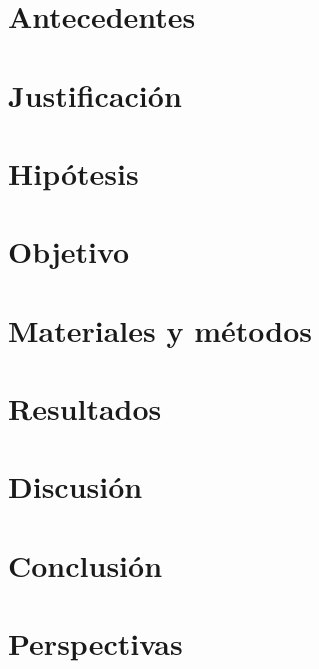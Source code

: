 \documentclass[12 pt]{report}
\begin{document}
    \chapter{Antecedentes}
        

    \chapter{Justificación}
        
    
    \chapter{Hipótesis}
        

    \chapter{Objetivo}
        

    \chapter{Materiales y métodos}
        

    \chapter{Resultados}
        

    \chapter{Discusión}
        
    
    \chapter{Conclusión}
        
    
    \chapter{Perspectivas}
        

\medskip

    \printbibliography[
        heading=bibintoc,
        title={Bibliografía}]
\end{document}
